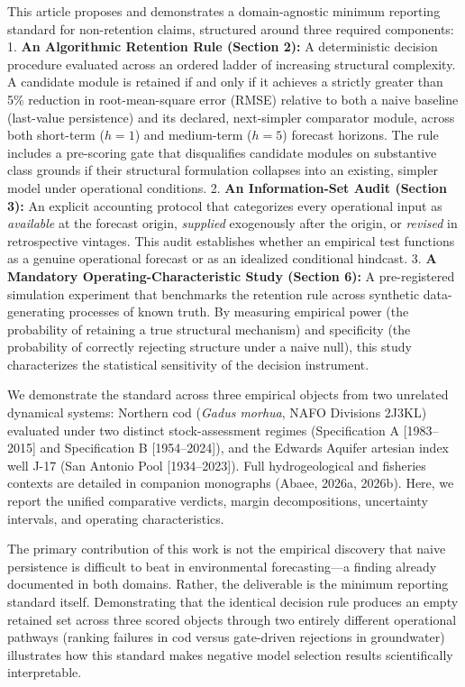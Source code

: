 \documentclass[11pt]{article}
\begin{document}
This article proposes and demonstrates a domain-agnostic minimum
reporting standard for non-retention claims, structured around three
required components: 1. \textbf{An Algorithmic Retention Rule (Section
2):} A deterministic decision procedure evaluated across an ordered
ladder of increasing structural complexity. A candidate module is
retained if and only if it achieves a strictly greater than 5\%
reduction in root-mean-square error (RMSE) relative to both a naive
baseline (last-value persistence) and its declared, next-simpler
comparator module, across both short-term (\(h = 1\)) and medium-term
(\(h = 5\)) forecast horizons. The rule includes a pre-scoring gate that
disqualifies candidate modules on substantive class grounds if their
structural formulation collapses into an existing, simpler model under
operational conditions. 2. \textbf{An Information-Set Audit (Section
3):} An explicit accounting protocol that categorizes every operational
input as \emph{available} at the forecast origin, \emph{supplied}
exogenously after the origin, or \emph{revised} in retrospective
vintages. This audit establishes whether an empirical test functions as
a genuine operational forecast or as an idealized conditional hindcast.
3. \textbf{A Mandatory Operating-Characteristic Study (Section 6):} A
pre-registered simulation experiment that benchmarks the retention rule
across synthetic data-generating processes of known truth. By measuring
empirical power (the probability of retaining a true structural
mechanism) and specificity (the probability of correctly rejecting
structure under a naive null), this study characterizes the statistical
sensitivity of the decision instrument.

We demonstrate the standard across three empirical objects from two
unrelated dynamical systems: Northern cod (\emph{Gadus morhua}, NAFO
Divisions 2J3KL) evaluated under two distinct stock-assessment regimes
(Specification A {[}1983--2015{]} and Specification B {[}1954--2024{]}),
and the Edwards Aquifer artesian index well J-17 (San Antonio Pool
{[}1934--2023{]}). Full hydrogeological and fisheries contexts are
detailed in companion monographs (Abaee, 2026a, 2026b). Here, we report
the unified comparative verdicts, margin decompositions, uncertainty
intervals, and operating characteristics.

The primary contribution of this work is not the empirical discovery
that naive persistence is difficult to beat in environmental
forecasting---a finding already documented in both domains. Rather, the
deliverable is the minimum reporting standard itself. Demonstrating that
the identical decision rule produces an empty retained set across three
scored objects through two entirely different operational pathways
(ranking failures in cod versus gate-driven rejections in groundwater)
illustrates how this standard makes negative model selection results
scientifically interpretable.
\end{document}
